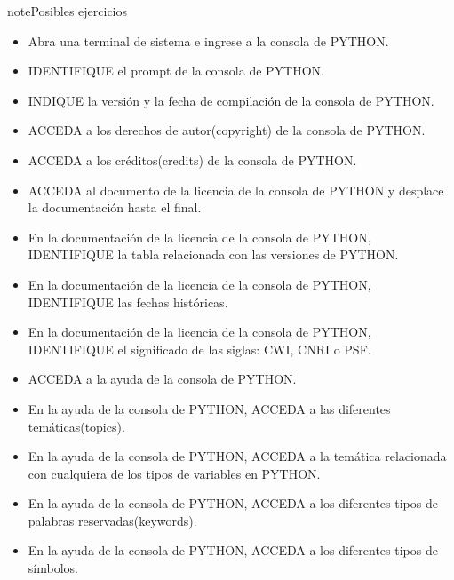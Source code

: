 \documentclass[letterpaper,10pt,spanish]{sphinxmanual}
\begin{document}
\begin{sphinxadmonition}{note}{Posibles ejercicios}
\begin{itemize}
\item {} 
\sphinxAtStartPar
Abra una terminal de sistema e ingrese a la consola de PYTHON.

\item {} 
\sphinxAtStartPar
IDENTIFIQUE el prompt de la consola de PYTHON.

\item {} 
\sphinxAtStartPar
INDIQUE la versión y la fecha de compilación de la consola de PYTHON.

\item {} 
\sphinxAtStartPar
ACCEDA a los derechos de autor(copyright) de la consola de PYTHON.

\item {} 
\sphinxAtStartPar
ACCEDA a los créditos(credits) de la consola de PYTHON.

\item {} 
\sphinxAtStartPar
ACCEDA al documento de la licencia de la consola de PYTHON y desplace la documentación hasta el final.

\item {} 
\sphinxAtStartPar
En la documentación de la licencia de la consola de PYTHON, IDENTIFIQUE la tabla relacionada con las versiones de PYTHON.

\item {} 
\sphinxAtStartPar
En la documentación de la licencia de la consola de PYTHON, IDENTIFIQUE las fechas históricas.

\item {} 
\sphinxAtStartPar
En la documentación de la licencia de la consola de PYTHON, IDENTIFIQUE el significado de las siglas: CWI, CNRI o PSF.

\item {} 
\sphinxAtStartPar
ACCEDA a la ayuda de la consola de PYTHON.

\item {} 
\sphinxAtStartPar
En la ayuda de la consola de PYTHON, ACCEDA a las diferentes temáticas(topics).

\item {} 
\sphinxAtStartPar
En la ayuda de la consola de PYTHON, ACCEDA a la temática relacionada con cualquiera de los tipos de variables en PYTHON.

\item {} 
\sphinxAtStartPar
En la ayuda de la consola de PYTHON, ACCEDA a los diferentes tipos de palabras reservadas(keywords).

\item {} 
\sphinxAtStartPar
En la ayuda de la consola de PYTHON, ACCEDA a los diferentes tipos de símbolos.

\end{itemize}
\end{sphinxadmonition}
\end{document}
